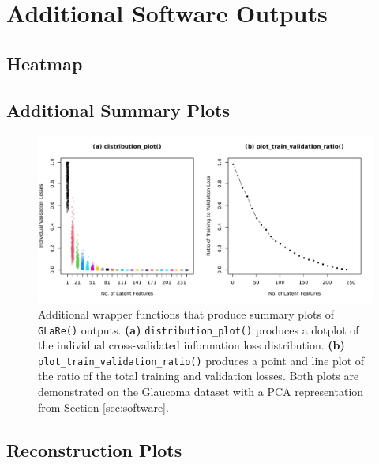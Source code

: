 \section{Additional Software Outputs}\label{sec:additional-outputs}


\subsection{Heatmap}


\subsection{Additional Summary Plots}

\begin{figure}
    \centering
    \includegraphics[width=1\linewidth]{figures/additional-plots-01.pdf}
    \caption{Additional wrapper functions that produce summary plots of \texttt{GLaRe()} outputs. \textbf{(a)} \texttt{distribution\_plot()} produces a dotplot of the individual cross-validated information loss distribution. \textbf{(b)} \texttt{plot\_train\_validation\_ratio()}
    \label{fig:additional-plots-01} produces a point and line plot of the ratio of the total training and validation losses.
    Both plots are demonstrated on the Glaucoma dataset with a PCA representation from Section \ref{sec:software}.}
\end{figure}

\subsection{Reconstruction Plots}